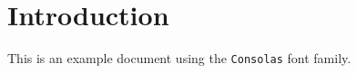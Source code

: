 \documentclass{article}
\begin{document}
\section{Introduction}

This is an example document using the \texttt{Consolas} font family.
\end{document}
